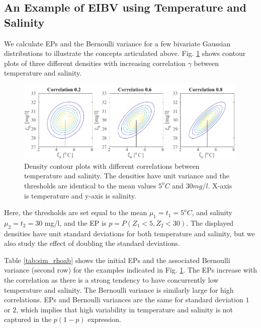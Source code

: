 \documentclass[aoas]{imsart}
\begin{document}
\subsection{An Example of EIBV using Temperature and Salinity}
\label{Sec:UnivarEx}

We calculate EPs and the Bernoulli variance for a few bivariate
Gaussian distributions to illustrate the concepts articulated above.
Fig. \ref{illus_bivarDens} shows contour plots of three different
densities with increasing correlation $\gamma$ between temperature and
salinity. 
\begin{figure}[h!] \centering
  \includegraphics[width=0.99\textwidth]{Figures/illus_bivar.pdf}
  \caption{Density contour plots with different correlations between
    temperature and salinity. The densities have unit variance and the
    thresholds are identical to the mean values $5^o C$ and
    $30 mg/l$. X-axis is temperature and y-axis is salinity.}
\label{illus_bivarDens}
\end{figure}
Here, the thresholds are set equal to the mean $\mu_1=t_1=5^o C$, and
salinity $\mu_2=t_2=30$ mg/l, and the EP is $p=P(Z_1 < 5,Z_2 < 30)$.
The displayed densities have unit standard deviations for both
temperature and salinity, but we also study the effect of doubling the
standard deviations.

Table \ref{tab:sim_rhoab} shows the initial EPs and the associated
Bernoulli variance (second row) for the examples indicated in Fig.
\ref{illus_bivarDens}. The EPs increase with the correlation as there
is a strong tendency to have concurrently low temperature and
salinity. The Bernoulli variance is similarly large for high
correlations. EPs and Bernoulli variances are the same for standard
deviation $1$ or $2$, which implies that high variability in
temperature and salinity is not captured in the $p(1-p)$ expression.
\end{document}
